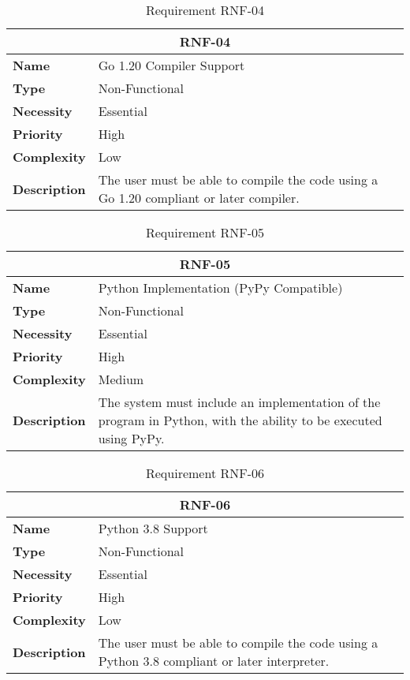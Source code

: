 \begin{table}[H]
    \centering
    \begin{tabular}{l p{10cm}}
        \toprule
        \multicolumn{2}{c}{\textbf{RNF-04}} \\
        \toprule
        \textbf{Name}               & Go 1.20 Compiler Support \\
        \textbf{Type}               & Non-Functional \\
        \textbf{Necessity}          & Essential \\
        \textbf{Priority}           & High \\
        \textbf{Complexity}         & Low \\
        \textbf{Description}        & The user must be able to compile the code using a Go 1.20 compliant or later compiler. \\
        \bottomrule
    \end{tabular}
\caption{Requirement RNF-04}\label{tab:rnf-04}
\end{table}

\begin{table}[H]
    \centering
    \begin{tabular}{l p{10cm}}
        \toprule
        \multicolumn{2}{c}{\textbf{RNF-05}} \\
        \toprule
        \textbf{Name}         & Python Implementation (PyPy Compatible) \\
        \textbf{Type}         & Non-Functional \\
        \textbf{Necessity}    & Essential \\
        \textbf{Priority}     & High \\
        \textbf{Complexity}   & Medium \\
        \textbf{Description}  & The system must include an implementation of the program in Python, with the ability to be executed using PyPy. \\
        \bottomrule
    \end{tabular}
\caption{Requirement RNF-05}\label{tab:rnf-05}
\end{table}

\begin{table}[H]
    \centering
    \begin{tabular}{l p{10cm}}
        \toprule
        \multicolumn{2}{c}{\textbf{RNF-06}} \\
        \toprule
        \textbf{Name}               & Python 3.8 Support \\
        \textbf{Type}               & Non-Functional \\
        \textbf{Necessity}          & Essential \\
        \textbf{Priority}           & High \\
        \textbf{Complexity}         & Low \\
        \textbf{Description}        & The user must be able to compile the code using a Python 3.8 compliant or later interpreter. \\
        \bottomrule
    \end{tabular}
\caption{Requirement RNF-06}\label{tab:rnf-06}
\end{table}

